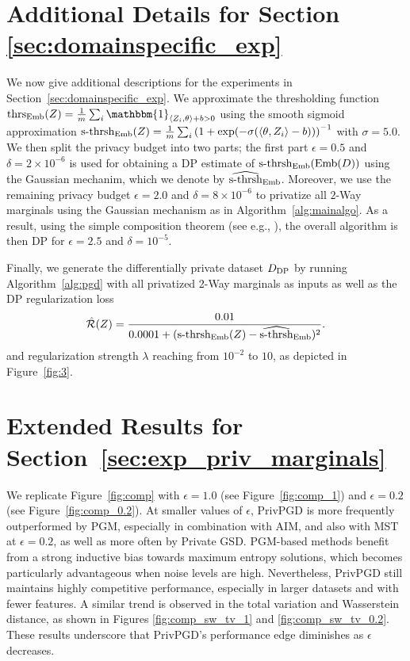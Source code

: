 \section{Additional Details for Section \ref{sec:domainspecific_exp}}
\label{appendix:details_domain}

We now give additional descriptions for the experiments in Section~\ref{sec:domainspecific_exp}. We approximate the thresholding function  $    \text{thrs}_{\embed}(\particles) = \frac{1}{m} \sum_i 
\mathbbm{1}_{\langle \particles_i, \theta \rangle + b>0}$  using the smooth sigmoid approximation
$
\text{s-thrsh}_{\text{Emb}}(Z) = \frac{1}{m} \sum_i \left(1 + \exp(-\sigma (\langle \theta, Z_i\rangle-b))\right)^{-1}
$ with $\sigma = 5.0$.  
We then split the privacy budget into two parts; the first part $\epsilon = 0.5$ and $\delta = 2 \times 10^{-6}$ is used for obtaining a DP estimate of 
$\text{s-thrsh}_{\text{Emb}}(\text{Emb}(D))$ using the Gaussian mechanim, which we denote by $\widehat{ \text{s-thrsh}}_{\text{Emb}}$. 
Moreover, we use the remaining privacy budget $\epsilon = 2.0$ and $\delta = 8 \times 10^{-6}$ to privatize all $2$-Way marginals using the Gaussian mechanism as in Algorithm~\ref{alg:mainalgo}. As a result, using the simple composition theorem (see e.g., \cite{dwork2004privacy}), the overall algorithm is then DP for $\epsilon= 2.5$ and $\delta = 10^{-5}$. 

Finally, we generate the differentially private dataset $D_{\text{DP}}$ by running Algorithm~\ref{alg:pgd} with all privatized 2-Way marginals as inputs as well as the DP regularization loss
\begin{equation}
         \hat {\mathcal R}(Z) = \frac{0.01}{0.0001 +  ( \text{s-thrsh}_{\text{Emb}}(Z)-\widehat{\text{s-thrsh}}_{\text{Emb}})^2}.
     \end{equation}
and regularization strength $\lambda$ reaching from $10^{-2}$ to $10$, as depicted in  Figure~\ref{fig:3}.

\section{Extended Results for Section~\ref{sec:exp_priv_marginals}}
\label{app:extended_results}

We replicate Figure~\ref{fig:comp} with $\epsilon=1.0$ (see Figure~\ref{fig:comp_1}) and $\epsilon=0.2$ (see Figure~\ref{fig:comp_0.2}). At smaller values of $\epsilon$, PrivPGD is more frequently outperformed by PGM, especially in combination with AIM, and also with MST at $\epsilon=0.2$, as well as more often by Private GSD. PGM-based methods benefit from a strong inductive bias towards maximum entropy solutions, which becomes particularly advantageous when noise levels are high. Nevertheless, PrivPGD still maintains highly competitive performance, especially in larger datasets and with fewer features. A similar trend is observed in the total variation and Wasserstein distance, as shown in Figures \ref{fig:comp_sw_tv_1} and \ref{fig:comp_sw_tv_0.2}. These results underscore that PrivPGD's performance edge diminishes as $\epsilon$ decreases. 

